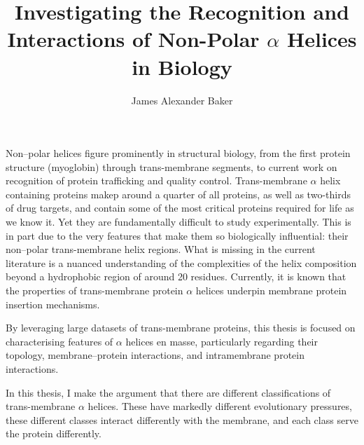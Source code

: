 \documentclass[12pt,PhD,twoside]{muthesis}
\begin{document}
\sloppy

\title{Investigating the Recognition and Interactions of Non-Polar \(\alpha\) Helices in Biology}
\author{James Alexander Baker}
\def\wordcount{22,000}






\beforeabstract{} %


Non\---polar helices figure prominently in structural biology, from the first protein structure (myoglobin) through trans-membrane segments, to current work on recognition of protein trafficking and quality control. Trans-membrane \(\alpha\) helix containing proteins makep around a quarter of all proteins, as well as two-thirds of drug targets, and contain some of the most critical proteins required for life as we know it. Yet they are fundamentally difficult to study experimentally. This is in part due to the very features that make them so biologically influential: their non\---polar trans-membrane helix regions. What is missing in the current literature is a nuanced understanding of the complexities of the helix composition beyond a hydrophobic region of around 20 residues. Currently, it is known that the properties of trans-membrane protein \(\alpha\) helices underpin membrane protein insertion mechanisms.

By leveraging large datasets of trans-membrane proteins, this thesis is focused on characterising features of \(\alpha\) helices en masse, particularly regarding their topology, membrane\---protein interactions, and intramembrane protein interactions.

In this thesis, I make the argument that there are different classifications of trans-membrane \(\alpha\) helices. These have markedly different evolutionary pressures, these different classes interact differently with the membrane, and each class serve the protein differently.
\end{document}
